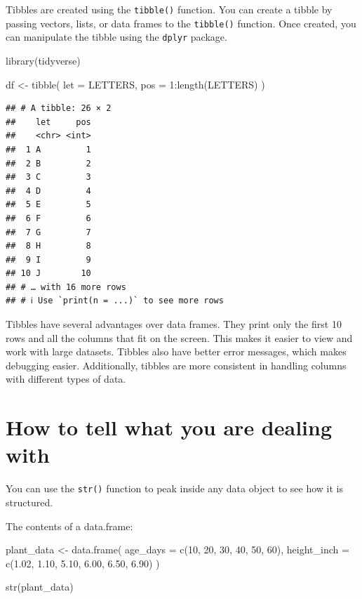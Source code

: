 \documentclass[
]{book}
\newenvironment{Shaded}{\begin{snugshade}}{\end{snugshade}}
\newcommand{\AttributeTok}[1]{\textcolor[rgb]{0.77,0.63,0.00}{#1}}
\newcommand{\DecValTok}[1]{\textcolor[rgb]{0.00,0.00,0.81}{#1}}
\newcommand{\FloatTok}[1]{\textcolor[rgb]{0.00,0.00,0.81}{#1}}
\newcommand{\FunctionTok}[1]{\textcolor[rgb]{0.00,0.00,0.00}{#1}}
\newcommand{\NormalTok}[1]{#1}
\newcommand{\OtherTok}[1]{\textcolor[rgb]{0.56,0.35,0.01}{#1}}
\newcommand{\SpecialCharTok}[1]{\textcolor[rgb]{0.00,0.00,0.00}{#1}}
\begin{document}
Tibbles are created using the \texttt{tibble()} function. You can create a tibble by passing vectors, lists, or data frames to the \texttt{tibble()} function. Once created, you can manipulate the tibble using the \texttt{dplyr} package.

\begin{Shaded}
\begin{Highlighting}[]
\FunctionTok{library}\NormalTok{(tidyverse)}

\NormalTok{df }\OtherTok{\textless{}{-}} \FunctionTok{tibble}\NormalTok{(}
  \AttributeTok{let =}\NormalTok{ LETTERS,}
  \AttributeTok{pos =} \DecValTok{1}\SpecialCharTok{:}\FunctionTok{length}\NormalTok{(LETTERS)}
\NormalTok{)}
\end{Highlighting}
\end{Shaded}

\begin{verbatim}
## # A tibble: 26 × 2
##    let     pos
##    <chr> <int>
##  1 A         1
##  2 B         2
##  3 C         3
##  4 D         4
##  5 E         5
##  6 F         6
##  7 G         7
##  8 H         8
##  9 I         9
## 10 J        10
## # … with 16 more rows
## # ℹ Use `print(n = ...)` to see more rows
\end{verbatim}

Tibbles have several advantages over data frames. They print only the first 10 rows and all the columns that fit on the screen. This makes it easier to view and work with large datasets. Tibbles also have better error messages, which makes debugging easier. Additionally, tibbles are more consistent in handling columns with different types of data.

\hypertarget{how-to-tell-what-you-are-dealing-with}{%
\section*{How to tell what you are dealing with}\label{how-to-tell-what-you-are-dealing-with}}

You can use the \texttt{str()} function to peak inside any data object to see how it is structured.

The contents of a data.frame:

\begin{Shaded}
\begin{Highlighting}[]
\NormalTok{plant\_data }\OtherTok{\textless{}{-}} \FunctionTok{data.frame}\NormalTok{(}
  \AttributeTok{age\_days =} \FunctionTok{c}\NormalTok{(}\DecValTok{10}\NormalTok{, }\DecValTok{20}\NormalTok{, }\DecValTok{30}\NormalTok{, }\DecValTok{40}\NormalTok{, }\DecValTok{50}\NormalTok{, }\DecValTok{60}\NormalTok{),}
  \AttributeTok{height\_inch =} \FunctionTok{c}\NormalTok{(}\FloatTok{1.02}\NormalTok{, }\FloatTok{1.10}\NormalTok{, }\FloatTok{5.10}\NormalTok{, }\FloatTok{6.00}\NormalTok{, }\FloatTok{6.50}\NormalTok{, }\FloatTok{6.90}\NormalTok{)}
\NormalTok{)}

\FunctionTok{str}\NormalTok{(plant\_data)}
\end{Highlighting}
\end{Shaded}
\end{document}
